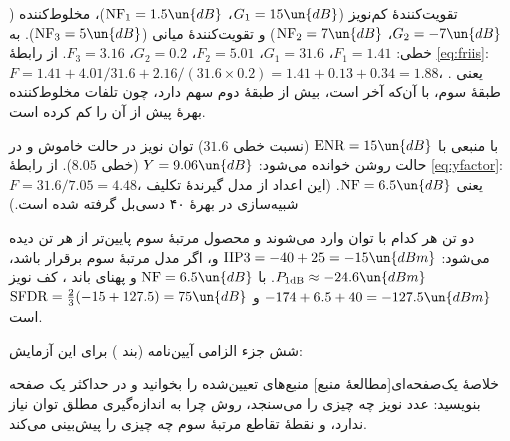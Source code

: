 \documentclass[a4paper,11pt]{article}
\begin{document}
\begin{example}
تقویت‌کنندهٔ کم‌نویز
($G_1 = 15\un{dB}$، $\mathrm{NF}_1 = 1.5\un{dB}$)،
مخلوط‌کننده
($G_2 = -7\un{dB}$، $\mathrm{NF}_2 = 7\un{dB}$)
و تقویت‌کنندهٔ میانی
($\mathrm{NF}_3 = 5\un{dB}$).
به خطی:
$F_1 = 1.41$، $G_1 = 31.6$، $F_2 = 5.01$، $G_2 = 0.2$، $F_3 = 3.16$.
از رابطهٔ
\eqref{eq:friis}:
$F = 1.41 + 4.01/31.6 + 2.16/(31.6 \times 0.2) = 1.41 + 0.13 + 0.34 = 1.88$،
یعنی
.
طبقهٔ سوم، با آن‌که آخر است، بیش از طبقهٔ دوم سهم دارد، چون تلفات مخلوط‌کننده بهرهٔ پیش از آن را کم کرده است.
\end{example}

\begin{example}[\lr{Y-Factor}]
با منبعی با
$\mathrm{ENR} = 15\un{dB}$
(نسبت خطی
$31.6$)
توان نویز در حالت خاموش
و در حالت روشن
خوانده می‌شود:
$Y = 9.06\un{dB}$
(خطی
$8.05$).
از رابطهٔ
\eqref{eq:yfactor}:
$F = 31.6/7.05 = 4.48$،
یعنی
$\mathrm{NF} = 6.5\un{dB}$.
(این اعداد از مدل گیرندهٔ تکلیف شبیه‌سازی در بهرهٔ ۴۰ دسی‌بل گرفته شده است.)
\end{example}

\begin{example}
دو تن هر کدام با توان
وارد می‌شوند و محصول مرتبهٔ سوم
پایین‌تر از هر تن دیده می‌شود:
$\mathrm{IIP3} = -40 + 25 = -15\un{dBm}$
و، اگر مدل مرتبهٔ سوم برقرار باشد،
$P_{\mathrm{1dB}} \approx -24.6\un{dBm}$.
با
$\mathrm{NF} = 6.5\un{dB}$
و پهنای باند
،
کف نویز
$-174 + 6.5 + 40 = -127.5\un{dBm}$
و
$\mathrm{SFDR} = \tfrac{2}{3}(-15 + 127.5) = 75\un{dB}$
است.
\end{example}

شش جزء الزامی آیین‌نامه (بند
)
برای این آزمایش:

\begin{task}{خلاصهٔ یک‌صفحه‌ای}[مطالعهٔ منبع]
منبع‌های تعیین‌شده را بخوانید و در حداکثر یک صفحه بنویسید: عدد نویز چه چیزی را می‌سنجد، روش
چرا به اندازه‌گیری مطلق توان نیاز ندارد، و نقطهٔ تقاطع مرتبهٔ سوم چه چیزی را پیش‌بینی می‌کند.
\end{task}
\end{document}
